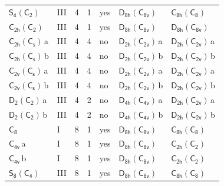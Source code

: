 \documentclass[10pt,a4paper]{article}
\numberwithin{equation}{section}
\newcommand{\grp}[1]{\mathsf{#1}}
\newcommand{\clsletter}[1]{\,{\scriptsize\color{black!55}#1}}
\begin{document}
{\begin{longtable}{@{}llrrlll@{}}
\href{S4-C2.pdf}{$\grp{S_{4}}(\grp{C_{2}})$} & III & 4 & 1 & yes & \href{D8h-C8v.pdf}{$\grp{D_{8h}}(\grp{C_{8v}})$} & \href{C8h-C8.pdf}{$\grp{C_{8h}}(\grp{C_{8}})$}\\
\href{C2h-C2.pdf}{$\grp{C_{2h}}(\grp{C_{2}})$} & III & 4 & 1 & yes & \href{D8h-C8v.pdf}{$\grp{D_{8h}}(\grp{C_{8v}})$} & \href{D8h-C8v.pdf}{$\grp{D_{8h}}(\grp{C_{8v}})$}\\
\href{C2h-C1v.pdf}{$\grp{C_{2h}}(\grp{C_{s}})$}\clsletter{a} & III & 4 & 4 & no & \href{D2h-C2v.pdf}{$\grp{D_{2h}}(\grp{C_{2v}})$}\clsletter{a} & \href{D2h-C2v.pdf}{$\grp{D_{2h}}(\grp{C_{2v}})$}\clsletter{a}\\
\href{C2h-C1v.pdf}{$\grp{C_{2h}}(\grp{C_{s}})$}\clsletter{b} & III & 4 & 4 & no & \href{D2h-C2v.pdf}{$\grp{D_{2h}}(\grp{C_{2v}})$}\clsletter{b} & \href{D2h-C2v.pdf}{$\grp{D_{2h}}(\grp{C_{2v}})$}\clsletter{b}\\
\href{C2v-C1v.pdf}{$\grp{C_{2v}}(\grp{C_{s}})$}\clsletter{a} & III & 4 & 4 & no & \href{D2h-C2v.pdf}{$\grp{D_{2h}}(\grp{C_{2v}})$}\clsletter{a} & \href{D2h-C2v.pdf}{$\grp{D_{2h}}(\grp{C_{2v}})$}\clsletter{a}\\
\href{C2v-C1v.pdf}{$\grp{C_{2v}}(\grp{C_{s}})$}\clsletter{b} & III & 4 & 4 & no & \href{D2h-C2v.pdf}{$\grp{D_{2h}}(\grp{C_{2v}})$}\clsletter{b} & \href{D2h-C2v.pdf}{$\grp{D_{2h}}(\grp{C_{2v}})$}\clsletter{b}\\
\href{D2-C2.pdf}{$\grp{D_{2}}(\grp{C_{2}})$}\clsletter{a} & III & 4 & 2 & no & \href{D4h-C4v.pdf}{$\grp{D_{4h}}(\grp{C_{4v}})$}\clsletter{a} & \href{D2h-C2v.pdf}{$\grp{D_{2h}}(\grp{C_{2v}})$}\clsletter{a}\\
\href{D2-C2.pdf}{$\grp{D_{2}}(\grp{C_{2}})$}\clsletter{b} & III & 4 & 2 & no & \href{D4h-C4v.pdf}{$\grp{D_{4h}}(\grp{C_{4v}})$}\clsletter{b} & \href{D2h-C2v.pdf}{$\grp{D_{2h}}(\grp{C_{2v}})$}\clsletter{b}\\
\href{../../../rotation/data/pdf/C8.pdf}{$\grp{C_{8}}$} & I & 8 & 1 & yes & \href{D8h-C8v.pdf}{$\grp{D_{8h}}(\grp{C_{8v}})$} & \href{C8h-C8.pdf}{$\grp{C_{8h}}(\grp{C_{8}})$}\\
\href{../../../rotation/data/pdf/C4v.pdf}{$\grp{C_{4v}}$}\clsletter{a} & I & 8 & 1 & yes & \href{D8h-C8v.pdf}{$\grp{D_{8h}}(\grp{C_{8v}})$} & \href{C2h-C2.pdf}{$\grp{C_{2h}}(\grp{C_{2}})$}\\
\href{../../../rotation/data/pdf/C4v.pdf}{$\grp{C_{4v}}$}\clsletter{b} & I & 8 & 1 & yes & \href{D8h-C8v.pdf}{$\grp{D_{8h}}(\grp{C_{8v}})$} & \href{C2h-C2.pdf}{$\grp{C_{2h}}(\grp{C_{2}})$}\\
\href{S8-C4.pdf}{$\grp{S_{8}}(\grp{C_{4}})$} & III & 8 & 1 & yes & \href{D8h-C8v.pdf}{$\grp{D_{8h}}(\grp{C_{8v}})$} & \href{C8h-C8.pdf}{$\grp{C_{8h}}(\grp{C_{8}})$}\\

\end{longtable}}
\end{document}
